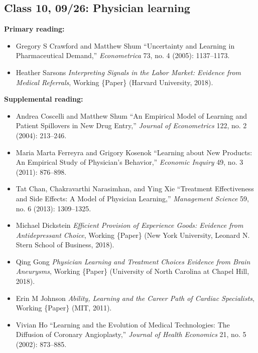 \documentclass[11pt,]{article}
\providecommand{\tightlist}{%
  \setlength{\itemsep}{0pt}\setlength{\parskip}{0pt}}
\begin{document}
\hypertarget{class-10-0926-physician-learning}{%
\subsection{Class 10, 09/26: Physician
learning}\label{class-10-0926-physician-learning}}

\textbf{Primary reading:}

\begin{itemize}
\tightlist
\item
  Gregory S Crawford and Matthew Shum {``Uncertainty and Learning in
  Pharmaceutical Demand,''} \emph{Econometrica} 73, no. 4 (2005):
  1137--1173.
\item
  Heather Sarsons \emph{Interpreting {Signals} in the {Labor} {Market}:
  {Evidence} from {Medical} {Referrals}}, Working \{Paper\} (Harvard
  University, 2018).
\end{itemize}

\textbf{Supplemental reading:}

\begin{itemize}
\tightlist
\item
  Andrea Coscelli and Matthew Shum {``An Empirical Model of Learning and
  Patient Spillovers in New Drug Entry,''} \emph{Journal of
  Econometrics} 122, no. 2 (2004): 213--246.
\item
  Maria Marta Ferreyra and Grigory Kosenok {``Learning about {New}
  {Products}: {An} {Empirical} {Study} of {Physician}'s {Behavior},''}
  \emph{Economic Inquiry} 49, no. 3 (2011): 876--898.
\item
  Tat Chan, Chakravarthi Narasimhan, and Ying Xie {``Treatment
  Effectiveness and Side Effects: {A} Model of Physician Learning,''}
  \emph{Management Science} 59, no. 6 (2013): 1309--1325.
\item
  Michael Dickstein \emph{Efficient Provision of Experience Goods:
  {Evidence} from Antidepressant Choice}, Working \{Paper\} (New York
  University, Leonard N. Stern School of Business, 2018).
\item
  Qing Gong \emph{Physician {Learning} and {Treatment} {Choices}
  {Evidence} from {Brain} {Aneurysms}}, Working \{Paper\} (University of
  North Carolina at Chapel Hill, 2018).
\item
  Erin M Johnson \emph{Ability, {Learning} and the {Career} {Path} of
  {Cardiac} {Specialists}}, Working \{Paper\} (MIT, 2011).
\item
  Vivian Ho {``Learning and the Evolution of Medical Technologies: The
  Diffusion of Coronary Angioplasty,''} \emph{Journal of Health
  Economics} 21, no. 5 (2002): 873--885.
\end{itemize}
\end{document}
